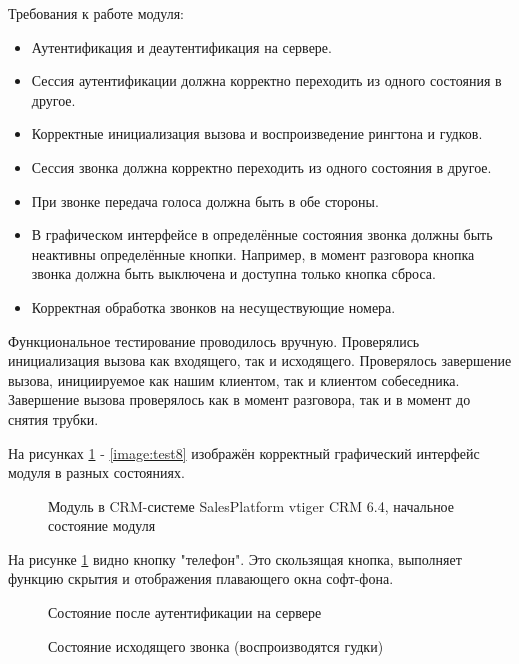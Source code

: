 Требования к работе модуля:
\begin{itemize}
\item Аутентификация и деаутентификация на сервере.
\item Сессия аутентификации должна корректно переходить из одного состояния в другое.
\item Корректные инициализация вызова и воспроизведение рингтона и гудков.
\item Сессия звонка должна корректно переходить из одного состояния в другое.
\item При звонке передача голоса должна быть в обе стороны.
\item В графическом интерфейсе в определённые состояния звонка должны быть неактивны определённые кнопки. Например, в момент разговора кнопка звонка должна быть выключена и доступна только кнопка сброса.
\item Корректная обработка звонков на несуществующие номера.
\end{itemize}

Функциональное тестирование проводилось вручную. Проверялись инициализация вызова как входящего, так и исходящего. Проверялось завершение вызова, инициируемое как нашим клиентом, так и клиентом собеседника. Завершение вызова проверялось как в момент разговора, так и в момент до снятия трубки.

На рисунках \ref{image:test1} - \ref{image:test8} изображён корректный графический интерфейс модуля в разных состояниях.

\begin{figure}[h!]
\caption{Модуль в CRM-системе SalesPlatform vtiger CRM 6.4, начальное состояние модуля}
\label{image:test1}
\end{figure}

На рисунке \ref{image:test1} видно кнопку "телефон". Это скользящая кнопка, выполняет функцию скрытия и отображения плавающего окна софт-фона.

\begin{figure}[h]
\caption{Состояние после аутентификации на сервере}
\label{image:test2}
\end{figure}

\begin{figure}[h]
\caption{Состояние исходящего звонка (воспроизводятся гудки)}
\label{image:test3}
\end{figure}

